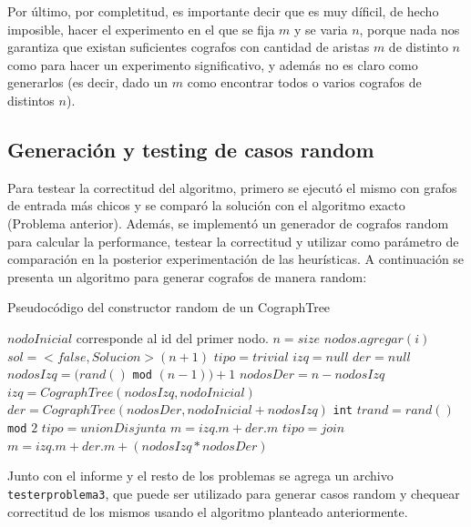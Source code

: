 Por último, por completitud, es importante decir que es muy díficil, de hecho imposible, hacer el experimento en el que se fija $m$ y se varia $n$, porque nada nos garantiza  que existan suficientes cografos con cantidad de aristas $m$ de distinto $n$ como para hacer un experimento significativo, y además no es claro como generarlos (es decir, dado un $m$ como encontrar todos o varios cografos de distintos $n$).


\subsection{Generación y testing de casos random}

Para testear la correctitud del algoritmo, primero se ejecutó el mismo con grafos de entrada más chicos y se comparó la solución con el algoritmo exacto (Problema anterior). Además, se implementó un generador de cografos random para calcular la performance, testear la correctitud y utilizar como parámetro de comparación en la posterior experimentación de las heurísticas.
A continuación se presenta un algoritmo para generar cografos de manera random:

\begin{algorithm}[H]
  \begin{algorithmic}[1]
  \caption{Pseudocódigo del constructor random de un CographTree}
  \label{algo:3-3}
	\State \Comment $nodoInicial$ corresponde al id del primer nodo.
	\State $n = size$
		\State $nodos.agregar(i)$ 
	\EndFor
	\State $sol = <false, Solucion>(n+1)$
		\State $tipo = trivial$
		\State $izq = null$
		\State $der = null$
	\Else
		\State $nodosIzq = (rand()$ \texttt{mod} $(n-1)) + 1 $
		\State $nodosDer = n - nodosIzq$
		\State $izq = CographTree(nodosIzq, nodoInicial)$
		\State $der = CographTree(nodosDer, nodoInicial + nodosIzq)$
		\State \texttt{int} $trand = rand()$ \texttt{mod} $2$
			\State $tipo = unionDisjunta$
			\State $m = izq.m + der.m$
		\Else
			\State $tipo = join$
			\State $m = izq.m + der.m + (nodosIzq * nodosDer)$
		\EndIf
	\EndIf		
  \EndProcedure
  \end{algorithmic}
\end{algorithm}

Junto con el informe y el resto de los problemas se agrega un archivo \texttt{testerproblema3}, que puede ser utilizado para generar casos random y chequear correctitud de los mismos usando el algoritmo planteado anteriormente.


